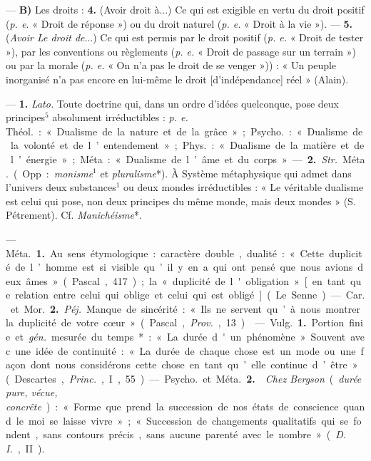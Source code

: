 \begin{itemize}[leftmargin=1cm, label=, itemsep=1pt]
— {\bf B)} Les droits : {\bf 4.} (Avoir droit
à...) Ce qui est exigible en vertu
du droit positif ({\it p. e.} « Droit de réponse ») ou du droit naturel ({\it p. e.}
« Droit à la vie »). — {\bf 5.} ({\it Avoir Le
droit de}...) Ce qui est permis par le
droit positif ({\it p. e.} « Droit de tester »),
par les conventions ou règlements
({\it p. e.} « Droit de passage sur un terrain ») ou par la morale ({\it p. e.} « On
n’a pas le droit de se venger »)) : « Un
peuple inorganisé n’a pas encore en
lui-même le droit [d'indépendance]
réel » (Alain).

 — {\bf 1.} {\it Lato.} Toute doctrine
qui, dans un ordre d'idées quelconque, pose deux principes$^5$ absolument irréductibles : {\it p. e.} \si{Théol.} :
« Dualisme de la nature et de la
grâce » ; \si{Psycho.} : « Dualisme de la
volonté et de l’entendement » ;
\si{Phys.} : « Dualisme de la matière et
de l’énergie » ; Méta : « Dualisme de
l’âme et du corps ».

— {\bf 2.} {\it Str.} \si{Méta.} (Opp. : {\it monisme}$^1$
et {\it pluralisme}*). À Système métaphysique qui admet dans l’univers deux
substances$^1$ ou deux mondes irréductibles : « Le véritable dualisme
est celui qui pose, non deux principes du même monde, mais deux
mondes » (S. Pétrement). Cf. {\it Manichéisme}*.

 — \si{Méta.} {\bf 1.} Au sens étymologique : caractère double, dualité :
« Cette duplicité de l’homme est si
visible qu’il y en a qui ont pensé
que nous avions deux âmes » (Pascal,
417); la « duplicité de l'obligation »
[en tant que relation entre celui qui
oblige et celui qui est obligé] (Le
Senne).

— \si{Car.} et \si{Mor.} {\bf 2.} {\it Péj.} Manque de
sincérité : « Ils ne servent qu’à nous
montrer la duplicité de votre cœur »
(Pascal, {\it Prov.}, 13).

 — \si{Vulg.} {\bf 1.} Portion finie et  {\it gén.}
mesurée du temps* : « La durée
d'un phénomène ». Souvent avec
une idée de continuité : « La durée
de chaque chose est un mode ou une
façon dont nous considérons cette
chose en tant qu’elle continue d’être»
(Descartes, {\it Princ.}, I, 55).

— \si{Psycho.} et \si{Méta.} {\bf 2.}  {\it Chez
Bergson} ({\it durée pure, vécue, concrête}) : « Forme que prend la succession de nos états de conscience
quand le moi se laisse vivre »; « Succession de changements qualitatifs
qui se fondent, sans contours précis,... sans aucune parenté avec le
nombre » ({\it D. I.}, II).


\end{itemize}
